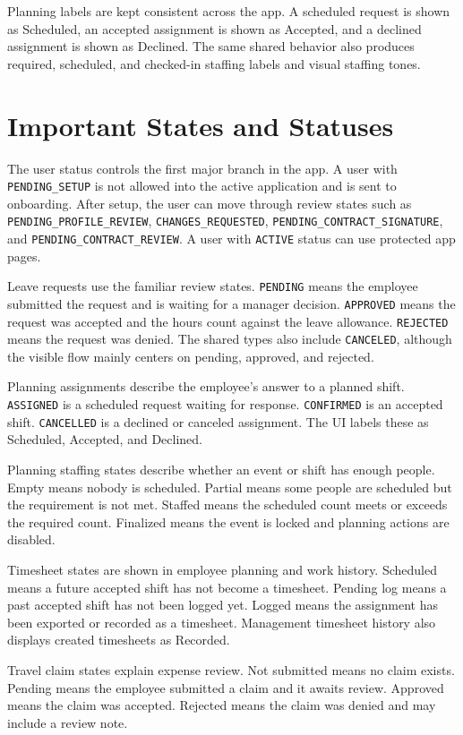 \documentclass[11pt]{article}
\newcommand{\code}[1]{\nolinkurl{#1}}
\begin{document}
Planning labels are kept consistent across the app. A scheduled request is shown as Scheduled, an accepted assignment is shown as Accepted, and a declined assignment is shown as Declined. The same shared behavior also produces required, scheduled, and checked-in staffing labels and visual staffing tones.

\section{Important States and Statuses}

The user status controls the first major branch in the app. A user with \code{PENDING_SETUP} is not allowed into the active application and is sent to onboarding. After setup, the user can move through review states such as \code{PENDING_PROFILE_REVIEW}, \code{CHANGES_REQUESTED}, \code{PENDING_CONTRACT_SIGNATURE}, and \code{PENDING_CONTRACT_REVIEW}. A user with \code{ACTIVE} status can use protected app pages.

Leave requests use the familiar review states. \code{PENDING} means the employee submitted the request and is waiting for a manager decision. \code{APPROVED} means the request was accepted and the hours count against the leave allowance. \code{REJECTED} means the request was denied. The shared types also include \code{CANCELED}, although the visible flow mainly centers on pending, approved, and rejected.

Planning assignments describe the employee's answer to a planned shift. \code{ASSIGNED} is a scheduled request waiting for response. \code{CONFIRMED} is an accepted shift. \code{CANCELLED} is a declined or canceled assignment. The UI labels these as Scheduled, Accepted, and Declined.

Planning staffing states describe whether an event or shift has enough people. Empty means nobody is scheduled. Partial means some people are scheduled but the requirement is not met. Staffed means the scheduled count meets or exceeds the required count. Finalized means the event is locked and planning actions are disabled.

Timesheet states are shown in employee planning and work history. Scheduled means a future accepted shift has not become a timesheet. Pending log means a past accepted shift has not been logged yet. Logged means the assignment has been exported or recorded as a timesheet. Management timesheet history also displays created timesheets as Recorded.

Travel claim states explain expense review. Not submitted means no claim exists. Pending means the employee submitted a claim and it awaits review. Approved means the claim was accepted. Rejected means the claim was denied and may include a review note.
\end{document}
